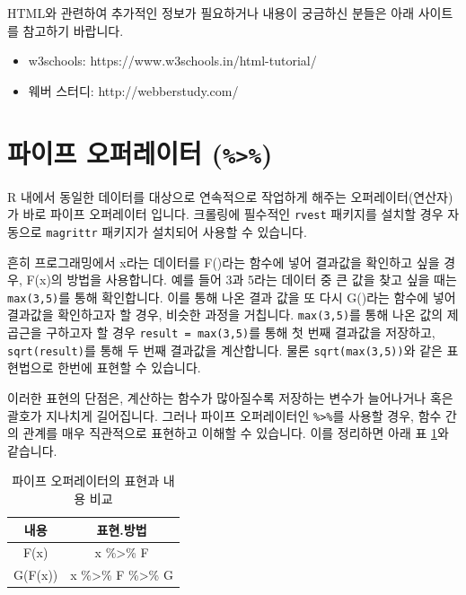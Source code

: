 \documentclass[12pt,]{book}
\providecommand{\tightlist}{%
  \setlength{\itemsep}{0pt}\setlength{\parskip}{0pt}}
\begin{document}
HTML와 관련하여 추가적인 정보가 필요하거나 내용이 궁금하신 분들은 아래 사이트를 참고하기 바랍니다.

\begin{itemize}
\tightlist
\item
  w3schools: https://www.w3schools.in/html-tutorial/
\item
  웨버 스터디: http://webberstudy.com/
\end{itemize}

\hypertarget{section-8}{%
\section{\texorpdfstring{파이프 오퍼레이터 (\texttt{\%\textgreater{}\%})}{파이프 오퍼레이터 (\%\textgreater{}\%)}}\label{section-8}}

R 내에서 동일한 데이터를 대상으로 연속적으로 작업하게 해주는 오퍼레이터(연산자)가 바로 파이프 오퍼레이터 입니다. 크롤링에 필수적인 \texttt{rvest} 패키지를 설치할 경우 자동으로 \texttt{magrittr} 패키지가 설치되어 사용할 수 있습니다.

흔히 프로그래밍에서 x라는 데이터를 F()라는 함수에 넣어 결과값을 확인하고 싶을 경우, F(x)의 방법을 사용합니다. 예를 들어 3과 5라는 데이터 중 큰 값을 찾고 싶을 때는 \texttt{max(3,5)}를 통해 확인합니다. 이를 통해 나온 결과 값을 또 다시 G()라는 함수에 넣어 결과값을 확인하고자 할 경우, 비슷한 과정을 거칩니다. \texttt{max(3,5)}를 통해 나온 값의 제곱근을 구하고자 할 경우 \texttt{result\ =\ max(3,5)}를 통해 첫 번째 결과값을 저장하고, \texttt{sqrt(result)}를 통해 두 번째 결과값을 계산합니다. 물론 \texttt{sqrt(max(3,5))}와 같은 표현법으로 한번에 표현할 수 있습니다.

이러한 표현의 단점은, 계산하는 함수가 많아질수록 저장하는 변수가 늘어나거나 혹은 괄호가 지나치게 길어집니다. 그러나 파이프 오퍼레이터인 \texttt{\%\textgreater{}\%}를 사용할 경우, 함수 간의 관계를 매우 직관적으로 표현하고 이해할 수 있습니다. 이를 정리하면 아래 표 \ref{tab:mag}와 같습니다.

\begin{table}[!h]

\caption{\label{tab:mag}파이프 오퍼레이터의 표현과 내용 비교}
\centering
\begin{tabular}{cc}
\toprule
내용 & 표현.방법\\
\midrule
\rowcolor{gray!6}  F(x) & x \%>\% F\\
G(F(x)) & x \%>\% F \%>\% G\\
\bottomrule
\end{tabular}
\end{table}
\end{document}
